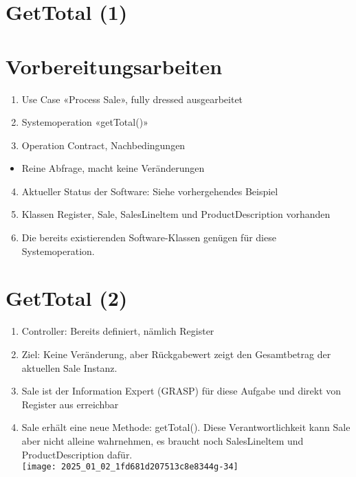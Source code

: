 \documentclass[10pt]{article}
\begin{document}
\section*{GetTotal (1)}
\section*{Vorbereitungsarbeiten}
\begin{enumerate}
  \item Use Case «Process Sale», fully dressed ausgearbeitet
  \item Systemoperation «getTotal()»
  \item Operation Contract, Nachbedingungen
\end{enumerate}

\begin{itemize}
  \item Reine Abfrage, macht keine Veränderungen
\end{itemize}

\begin{enumerate}
  \setcounter{enumi}{3}
  \item Aktueller Status der Software: Siehe vorhergehendes Beispiel
  \item Klassen Register, Sale, SalesLineltem und ProductDescription vorhanden
  \item Die bereits existierenden Software-Klassen genügen für diese Systemoperation.
\end{enumerate}

\section*{GetTotal (2)}
\begin{enumerate}
  \item Controller: Bereits definiert, nämlich Register
  \item Ziel: Keine Veränderung, aber Rückgabewert zeigt den Gesamtbetrag der aktuellen Sale Instanz.
  \item Sale ist der Information Expert (GRASP) für diese Aufgabe und direkt von Register aus erreichbar
  \item Sale erhält eine neue Methode: getTotal(). Diese Verantwortlichkeit kann Sale aber nicht alleine wahrnehmen, es braucht noch SalesLineltem und ProductDescription dafür.\\
\texttt{[image: 2025\_01\_02\_1fd681d207513c8e8344g-34]}
\end{enumerate}
\end{document}
